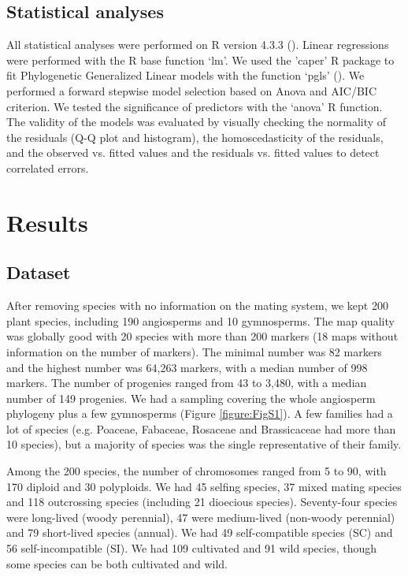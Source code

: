 \documentclass{article}
\begin{document}
\subsection*{Statistical analyses}



All statistical analyses were performed on R version 4.3.3 (\cite{rcoreteamLanguageEnvironmentStatistical2022}). Linear regressions were performed with the R base function ‘lm’. We used the 'caper' R package to fit Phylogenetic Generalized Linear models with the function ‘pgls’ (\cite{ormeCaperComparativeAnalyses2018}). We performed a forward stepwise model selection based on Anova and AIC/BIC criterion. We tested the significance of predictors with the ‘anova’ R function. The validity of the models was evaluated by visually checking the normality of the residuals (Q-Q plot and histogram), the homoscedasticity of the residuals, and the observed vs. fitted values and the residuals vs. fitted values to detect correlated errors.





\section*{Results}


\subsection*{Dataset}


After removing species with no information on the mating system, we kept 200 plant species, including 190 angiosperms and 10 gymnosperms. The map quality was globally good with 20 species with more than 200 markers (18 maps without information on the number of markers). The minimal number was 82 markers and the highest number was 64,263 markers, with a median number of 998 markers. The number of progenies ranged from 43 to 3,480, with a median number of 149 progenies. We had a sampling covering the whole angiosperm phylogeny plus a few gymnosperms (Figure \ref{figure:FigS1}). A few families had a lot of species (e.g. Poaceae, Fabaceae, Rosaceae and Brassicaceae had more than 10 species), but a majority of species was the single representative of their family.


Among the 200 species, the number of chromosomes ranged from 5 to 90, with 170 diploid and 30 polyploids. We had 45 selfing species, 37 mixed mating species and 118 outcrossing species (including 21 dioecious species). Seventy-four species were long-lived (woody perennial), 47 were medium-lived (non-woody perennial) and 79 short-lived species (annual). We had 49 self-compatible species (SC) and 56 self-incompatible (SI). We had 109 cultivated and 91 wild species, though some species can be both cultivated and wild.
\end{document}

